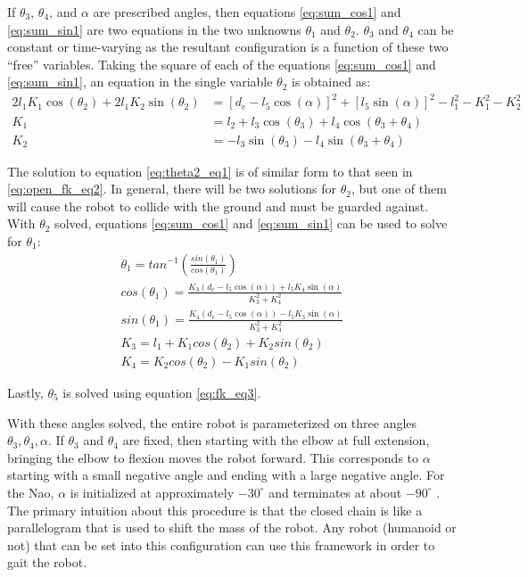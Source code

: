 If $\theta_3$, $\theta_4$, and $\alpha$ are prescribed angles, then equations \ref{eq:sum_cos1} and \ref{eq:sum_sin1} are two equations 
in the two unknowns $\theta_1$ and $\theta_2$. 
$\theta_3$ and $\theta_4$ can be constant or time-varying as the resultant configuration is a function of 
these two ``free'' variables.
Taking the square of each of the equations \ref{eq:sum_cos1} and \ref{eq:sum_sin1}, 
an equation in the single variable $\theta_2$ is obtained as:
\begin{align}
	2l_1 K_1 \cos(\theta_2) + 2l_1K_2 \sin(\theta_2) &= [d_e - l_5 \cos(\alpha)]^2 + [l_5 \sin(\alpha)]^2 - l_1^2 - K_1^2 - K_2^2 \label{eq:theta2_eq1} \\
	K_1 &= l_2 + l_3 \cos(\theta_3) + l_4 \cos(\theta_3 + \theta_4) \label{eq:theta2_eq2}\\
	K_2 &= -l_3 \sin(\theta_3) - l_4 \sin(\theta_3 + \theta_4) \label{eq:theta2_eq3}
\end{align}

The solution to equation \ref{eq:theta2_eq1} is of similar form to that seen in \ref{eq:open_fk_eq2}.
In general, there will be two solutions for $\theta_2$, but one of them will cause the robot to collide
with the ground and must be guarded against.
With $\theta_2$ solved, equations \ref{eq:sum_cos1} and \ref{eq:sum_sin1} can be used to solve for $\theta_1$:
\begin{align}
	\theta_1 = tan^{-1} \left( \frac{sin(\theta_1)}{cos(\theta_1)} \right ) \label{eq:theta1_eq1}\\
	cos(\theta_1) = \frac{K_3 (d_e - l_5 \cos(\alpha)) + l_5 K_4 \sin(\alpha)}{K_3^2 + K_4^2} \label{eq:theta1_eq2}\\
	sin(\theta_1) = \frac{K_4 (d_e - l_5 \cos(\alpha)) - l_5 K_3 \sin(\alpha)}{K_3^2 + K_4^2} \label{eq:theta1_eq3}\\
	K_3 = l_1 + K_1 cos(\theta_2) + K_2 sin(\theta_2) \label{eq:theta1_eq4}\\
	K_4 = K_2 cos(\theta_2) - K_1 sin(\theta_2) \label{eq:theta1_eq5}
\end{align}

Lastly, $\theta_5$ is solved using equation \ref{eq:fk_eq3}.

With these angles solved, the entire robot is parameterized on three angles $\theta_3, \theta_4, \alpha$.
If $\theta_3$ and $\theta_4$ are fixed, then starting with the elbow at full extension, bringing the elbow
to flexion moves the robot forward. This corresponds to $\alpha$ starting with a small negative angle and 
ending with a large negative angle. 
For the Nao, $\alpha$ is initialized at approximately $-30^\circ$ and terminates at about $-90^\circ$ .
The primary intuition about this procedure is that the closed chain is like a parallelogram that is used to shift
the mass of the robot. Any robot (humanoid or not) that can be set into this configuration can use this 
framework in order to gait the robot.

